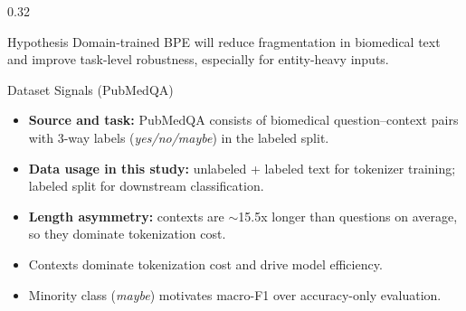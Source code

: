 \documentclass[final]{beamer}
\begin{document}
\begin{frame}[t]
\begin{columns}[t,totalwidth=\textwidth]
\begin{column}{0.32\textwidth}
\begin{alertblock}{Hypothesis}
\justifying
Domain-trained BPE will reduce fragmentation in biomedical text and improve task-level robustness, especially for entity-heavy inputs.
\end{alertblock}

\begin{block}{Dataset Signals (PubMedQA)}
\justifying
\small
\begin{center}
\end{center}
\vspace{0.2em}
\begin{itemize}
    \item \textbf{Source and task:} PubMedQA consists of biomedical question--context pairs with 3-way labels (\textit{yes/no/maybe}) in the labeled split.
    \item \textbf{Data usage in this study:} unlabeled + labeled text for tokenizer training; labeled split for downstream classification.
    \item \textbf{Length asymmetry:} contexts are \(\sim\)15.5x longer than questions on average, so they dominate tokenization cost.
    \item Contexts dominate tokenization cost and drive model efficiency.
    \item Minority class (\textit{maybe}) motivates macro-F1 over accuracy-only evaluation.
\end{itemize}
\end{block}


\end{column}
\end{columns}
\end{frame}
\end{document}
